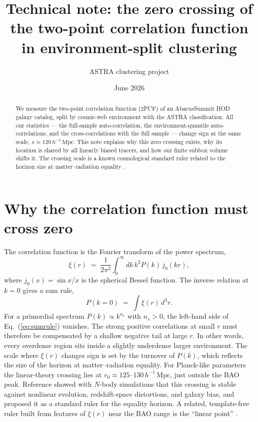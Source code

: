 \documentclass[11pt]{article}
\title{Technical note: the zero crossing of the two-point correlation
function in environment-split clustering}
\author{ASTRA clustering project}
\date{June 2026}
\newcommand{\Mpch}{\,h^{-1}\,\mathrm{Mpc}}
\begin{document}
\maketitle

\begin{abstract}
We measure the two-point correlation function (2PCF) of an AbacusSummit
HOD galaxy catalog, split by cosmic-web environment with the ASTRA
classification.  All our statistics --- the full-sample auto-correlation,
the environment-quantile auto-correlations, and the cross-correlations with
the full sample --- change sign at the same scale, $s \simeq 120\Mpch$.
This note explains why this zero crossing exists, why its location is
shared by all linearly biased tracers, and how our finite subbox volume
shifts it.  The crossing scale is a known cosmological standard ruler
related to the horizon size at matter--radiation equality
\cite{prada2011}.
\end{abstract}

\section{Why the correlation function must cross zero}

The correlation function is the Fourier transform of the power spectrum,
\begin{equation}
\xi(r) \;=\; \frac{1}{2\pi^{2}} \int_{0}^{\infty} dk\, k^{2} P(k)\,
j_{0}(kr),
\label{eq:xi_from_pk}
\end{equation}
where $j_{0}(x) = \sin x / x$ is the spherical Bessel function.  The
inverse relation at $k=0$ gives a sum rule,
\begin{equation}
P(k\!=\!0) \;=\; \int \xi(r)\, d^{3}r .
\label{eq:sumrule}
\end{equation}
For a primordial spectrum $P(k) \propto k^{n_s}$ with $n_s > 0$, the
left-hand side of Eq.~(\ref{eq:sumrule}) vanishes.  The strong positive
correlations at small $r$ must therefore be compensated by a shallow
negative tail at large $r$.  In other words, every overdense region sits
inside a slightly underdense larger environment.  The scale where
$\xi(r)$ changes sign is set by the turnover of $P(k)$, which reflects
the size of the horizon at matter--radiation equality.  For Planck-like
parameters the linear-theory crossing lies at $r_{0} \approx
125$--$130\Mpch$, just outside the BAO peak.  Reference \cite{prada2011}
showed with $N$-body simulations that this crossing is stable against
nonlinear evolution, redshift-space distortions, and galaxy bias, and
proposed it as a standard ruler for the equality horizon.  A related,
template-free ruler built from features of $\xi(r)$ near the BAO range is
the ``linear point'' \cite{anselmi2016,anselmi2018}.
\end{document}
